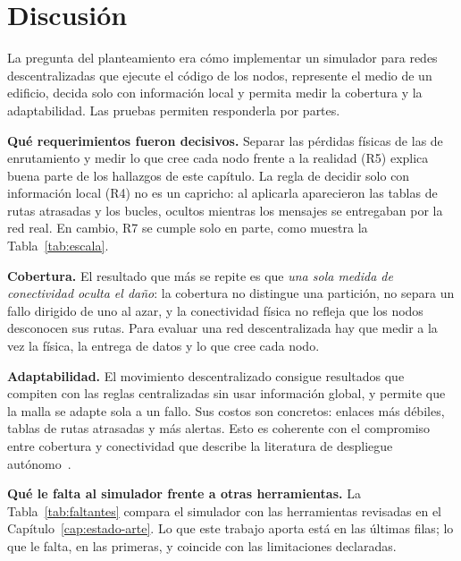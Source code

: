 \section{Discusión}
\label{sec:discusion}

La pregunta del planteamiento era cómo implementar un simulador para redes
descentralizadas que ejecute el código de los nodos, represente el medio de un
edificio, decida solo con información local y permita medir la cobertura y la
adaptabilidad. Las pruebas permiten responderla por partes.

\textbf{Qué requerimientos fueron decisivos.} Separar las pérdidas físicas de
las de enrutamiento y medir lo que cree cada nodo frente a la realidad (R5)
explica buena parte de los hallazgos de este capítulo. La regla de decidir solo
con información local (R4) no es un capricho: al aplicarla aparecieron las
tablas de rutas atrasadas y los bucles, ocultos mientras los mensajes se
entregaban por la red real. En cambio, R7 se cumple solo en parte, como muestra
la Tabla~\ref{tab:escala}.

\textbf{Cobertura.} El resultado que más se repite es que \textit{una sola
medida de conectividad oculta el daño}: la cobertura no distingue una
partición, no separa un fallo dirigido de uno al azar, y la conectividad física
no refleja que los nodos desconocen sus rutas. Para evaluar una red
descentralizada hay que medir a la vez la física, la entrega de datos y lo que
cree cada nodo.

\textbf{Adaptabilidad.} El movimiento descentralizado consigue resultados que
compiten con las reglas centralizadas sin usar información global, y permite
que la malla se adapte sola a un fallo. Sus costos son concretos: enlaces más
débiles, tablas de rutas atrasadas y más alertas. Esto es coherente con el
compromiso entre cobertura y conectividad que describe la literatura de
despliegue autónomo~\cite{Poduri2004ConstrainedCoverage}.

\textbf{Qué le falta al simulador frente a otras herramientas.} La
Tabla~\ref{tab:faltantes} compara el simulador con las herramientas revisadas
en el Capítulo~\ref{cap:estado-arte}. Lo que este trabajo aporta está en las
últimas filas; lo que le falta, en las primeras, y coincide con las
limitaciones declaradas.

